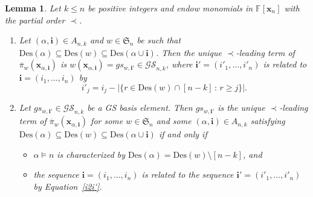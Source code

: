 \documentclass[10pt]{amsart}
\newtheorem{lemma}[theorem]{Lemma}
\theoremstyle{definition}
\newcommand{\Des}{{\mathrm {Des}}}
\newcommand{\symm}{{\mathfrak{S}}}
\newcommand{\FF}{{\mathbb{F}}}
\newcommand{\GS}{{\mathcal{GS}}}
\newcommand{\xx}{{\mathbf {x}}}
\newcommand{\ii}{{\mathbf{i}}}
\newcommand{\pib}{\overline{\pi}}
\begin{document}
\begin{lemma}
\label{gs-n-lemma}  
Let $k \leq n$ be positive integers and endow monomials in $\FF[\xx_n]$
with the partial order $\prec$.
\begin{enumerate}[label=\textup{(}\roman*\textup{)}]
\item  Let $(\alpha, \ii) \in A_{n,k}$ and $w \in \symm_n$ be such that 
$\Des(\alpha) \subseteq \Des(w) \subseteq \Des(\alpha \cup \ii)$.  
Then the unique $\prec$-leading term of 
$\pib_w(\xx_{\alpha,\ii})$ is $w(\xx_{\alpha,\ii}) = gs_{w,\ii'} \in \GS_{n,k}$, where
$\ii' = (i'_1, \dots, i'_n)$ is related to $\ii = (i_1, \dots, i_n)$ by
\begin{equation}\label{i2i'}
i'_j = i_j - | \{r \in \Des(w)\cap[n-k] \,:\, r \geq j \} |.
\end{equation}
\item Let $gs_{w,\ii'} \in \GS_{n,k}$ be a GS basis element.  
Then $gs_{w,\ii'}$ is the unique $\prec$-leading term of $\pib_w(\xx_{\alpha,\ii})$ 
for some $w\in\symm_n$ and some $(\alpha,\ii) \in A_{n,k}$ satisfying
$\Des(\alpha) \subseteq \Des(w) \subseteq \Des(\alpha \cup \ii)$ if and only if 
\begin{itemize}
\item  $\alpha \models n$ is characterized by $\Des(\alpha) = \Des(w) \setminus [n-k]$, and
\item the sequence $\ii = (i_1, \dots, i_n)$ is related to the sequence $\ii' = (i'_1, \dots, i'_n)$ by Equation~\eqref{i2i'}.
\end{itemize}
\end{enumerate}
\end{lemma}
\end{document}
